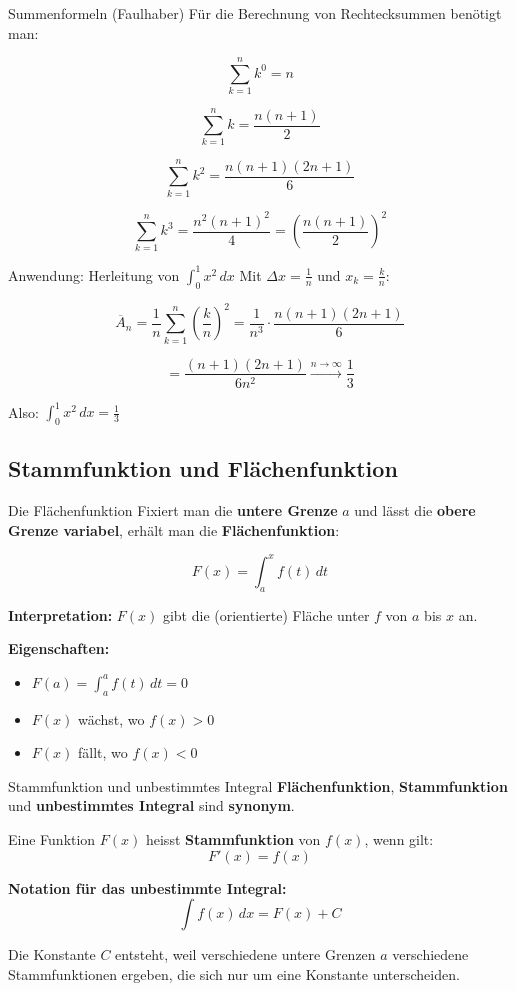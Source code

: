 \documentclass[a4paper,fontsize = 7pt]{scrartcl}
\begin{document}
\begin{mainbox}{Summenformeln (Faulhaber)}
Für die Berechnung von Rechtecksummen benötigt man:

$$\sum_{k=1}^{n} k^0 = n$$

$$\sum_{k=1}^{n} k = \frac{n(n+1)}{2}$$

$$\sum_{k=1}^{n} k^2 = \frac{n(n+1)(2n+1)}{6}$$

$$\sum_{k=1}^{n} k^3 = \frac{n^2(n+1)^2}{4} = \left(\frac{n(n+1)}{2}\right)^2$$
\end{mainbox}

\begin{subbox}{Anwendung: Herleitung von $\int_0^1 x^2 \, dx$}
Mit $\Delta x = \frac{1}{n}$ und $x_k = \frac{k}{n}$:

$$\overline{A}_n = \frac{1}{n} \sum_{k=1}^{n} \left(\frac{k}{n}\right)^2 = \frac{1}{n^3} \cdot \frac{n(n+1)(2n+1)}{6}$$

$$= \frac{(n+1)(2n+1)}{6n^2} \xrightarrow{n \to \infty} \frac{1}{3}$$

Also: $\int_0^1 x^2 \, dx = \frac{1}{3}$
\end{subbox}

\subsection{Stammfunktion und Flächenfunktion}

\begin{mainbox}{Die Flächenfunktion}
Fixiert man die \textbf{untere Grenze} $a$ und lässt die \textbf{obere Grenze variabel}, erhält man die \textbf{Flächenfunktion}:

$$\boxed{F(x) = \int_a^x f(t) \, dt}$$

\textbf{Interpretation:} $F(x)$ gibt die (orientierte) Fläche unter $f$ von $a$ bis $x$ an.

\textbf{Eigenschaften:}
\begin{itemize}
	\item $F(a) = \int_a^a f(t) \, dt = 0$
	\item $F(x)$ wächst, wo $f(x) > 0$
	\item $F(x)$ fällt, wo $f(x) < 0$
\end{itemize}
\end{mainbox}

\begin{mainbox}{Stammfunktion und unbestimmtes Integral}
\textbf{Flächenfunktion}, \textbf{Stammfunktion} und \textbf{unbestimmtes Integral} sind \textbf{synonym}.

Eine Funktion $F(x)$ heisst \textbf{Stammfunktion} von $f(x)$, wenn gilt:
$$F'(x) = f(x)$$

\textbf{Notation für das unbestimmte Integral:}
$$\int f(x) \, dx = F(x) + C$$

Die Konstante $C$ entsteht, weil verschiedene untere Grenzen $a$ verschiedene Stammfunktionen ergeben, die sich nur um eine Konstante unterscheiden.
\end{mainbox}
\end{document}
